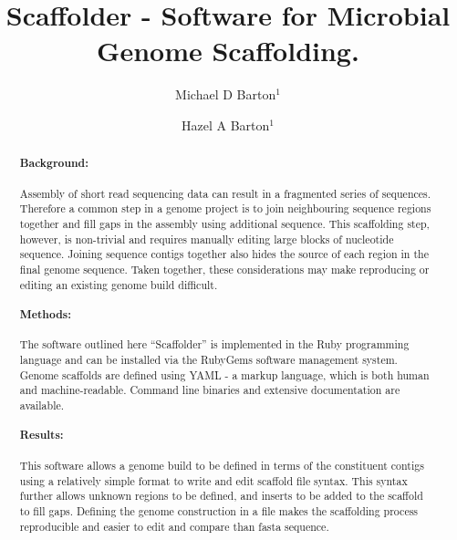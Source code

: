 \documentclass[10pt]{bmc_article}
\newenvironment{bmcformat}{\begin{raggedright}\baselineskip20pt\sloppy\setboolean{publ}{false}}{\end{raggedright}\baselineskip20pt\sloppy}
\begin{document}
\begin{bmcformat}

\title{Scaffolder - Software for Microbial Genome Scaffolding.} %

\author{
  Michael D Barton$^{1}$\correspondingauthor%
\and
  Hazel A Barton$^1$%
      }

\address{\iid(1) Department of Biological Sciences, Northern Kentucky %
University, Nunn Drive, Highland Heights, KY 41076 }%

\maketitle

\clearpage

\begin{abstract} %

  \paragraph*{Background:} Assembly of short read sequencing data can result in
  a fragmented series of sequences. Therefore a common step in a genome project
  is to join neighbouring sequence regions together and fill gaps in the
  assembly using additional sequence. This scaffolding step, however, is
  non-trivial and requires manually editing large blocks of nucleotide
  sequence. Joining sequence contigs together also hides the source of each
  region in the final genome sequence. Taken together, these considerations may
  make reproducing or editing an existing genome build difficult.

  \paragraph*{Methods:} The software outlined here ``Scaffolder'' is
  implemented in the Ruby programming language and can be installed via the
  RubyGems software management system. Genome scaffolds are defined using
  YAML - a markup language, which is both human and machine-readable. Command
  line binaries and extensive documentation are available.

  \paragraph*{Results:} This software allows a genome build to be defined in
  terms of the constituent contigs using a relatively simple format to write
  and edit scaffold file syntax. This syntax further allows  unknown regions to
  be defined, and inserts to be added to the scaffold to fill gaps. Defining
  the genome construction in a file makes the scaffolding process reproducible
  and easier to edit and compare than fasta sequence.


\end{abstract}
\end{bmcformat}
\end{document}
